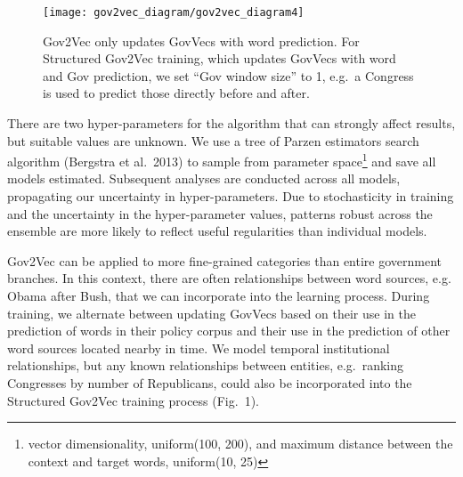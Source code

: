 \documentclass[11pt,letterpaper]{article}
\begin{document}
\begin{figure}[t]
\texttt{[image: gov2vec\_diagram/gov2vec\_diagram4]}
\caption{Gov2Vec only updates GovVecs with word prediction. For Structured Gov2Vec training, which updates GovVecs with word and Gov prediction, we set ``Gov window size'' to 1, e.g.~a Congress is used to predict those directly before and after.}
\end{figure}

There are two hyper-parameters for the algorithm that can strongly affect results, but suitable values are unknown. 
We use a tree of Parzen estimators search algorithm (Bergstra et al.~2013) to sample from parameter space\footnote{vector dimensionality, uniform(100, 200), and
maximum distance between the context and target words, uniform(10, 25)} and save
all models estimated. Subsequent analyses are conducted across all models, propagating our
uncertainty in hyper-parameters. 
Due to stochasticity in training and the uncertainty in the hyper-parameter values, patterns robust across the ensemble are more likely to reflect useful regularities than individual models.

Gov2Vec can be applied to more fine-grained categories than entire
government branches. In this context, there are often relationships between word
sources, e.g. Obama after Bush, that we can incorporate into the
learning process. During training, we alternate between updating GovVecs
based on their use in the prediction of words in their policy corpus
and their use in the prediction of other word sources located nearby
in time. We model temporal institutional relationships, but any known relationships between entities, e.g.~ranking
Congresses by number of Republicans, could also be incorporated into the
Structured Gov2Vec training process (Fig.~1).
\end{document}
